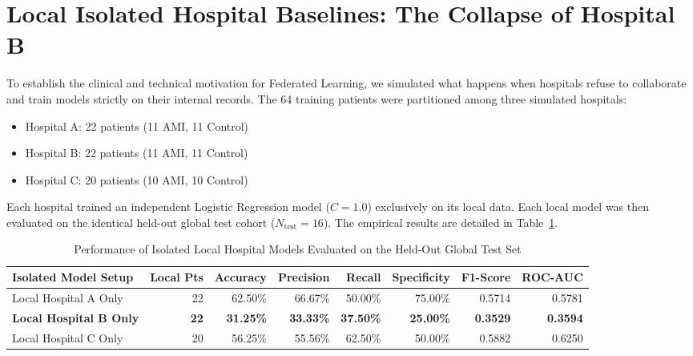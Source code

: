 \documentclass[12pt,a4paper,oneside]{report}
\begin{document}
\section{Local Isolated Hospital Baselines: The Collapse of Hospital B}
\label{sec:local_baselines}

To establish the clinical and technical motivation for Federated Learning, we simulated what happens when hospitals refuse to collaborate and train models strictly on their internal records. The 64 training patients were partitioned among three simulated hospitals:
\begin{itemize}
    \item Hospital A: 22 patients (11 AMI, 11 Control)
    \item Hospital B: 22 patients (11 AMI, 11 Control)
    \item Hospital C: 20 patients (10 AMI, 10 Control)
\end{itemize}

Each hospital trained an independent Logistic Regression model ($C=1.0$) exclusively on its local data. Each local model was then evaluated on the identical held-out global test cohort ($N_{\text{test}} = 16$). The empirical results are detailed in Table~\ref{tab:local_metrics}.

\begin{table}[htbp]
\centering
\caption{Performance of Isolated Local Hospital Models Evaluated on the Held-Out Global Test Set}
\label{tab:local_metrics}
\begin{tabular}{@{}lrrrrrrr@{}}
\toprule
\textbf{Isolated Model Setup} & \textbf{Local Pts} & \textbf{Accuracy} & \textbf{Precision} & \textbf{Recall} & \textbf{Specificity} & \textbf{F1-Score} & \textbf{ROC-AUC} \\ \midrule
Local Hospital A Only & 22 & 62.50\% & 66.67\% & 50.00\% & 75.00\% & 0.5714 & 0.5781 \\
\textbf{Local Hospital B Only} & \textbf{22} & \textbf{31.25\%} & \textbf{33.33\%} & \textbf{37.50\%} & \textbf{25.00\%} & \textbf{0.3529} & \textbf{0.3594} \\
Local Hospital C Only & 20 & 56.25\% & 55.56\% & 62.50\% & 50.00\% & 0.5882 & 0.6250 \\ \bottomrule
\end{tabular}
\end{table}
\end{document}

